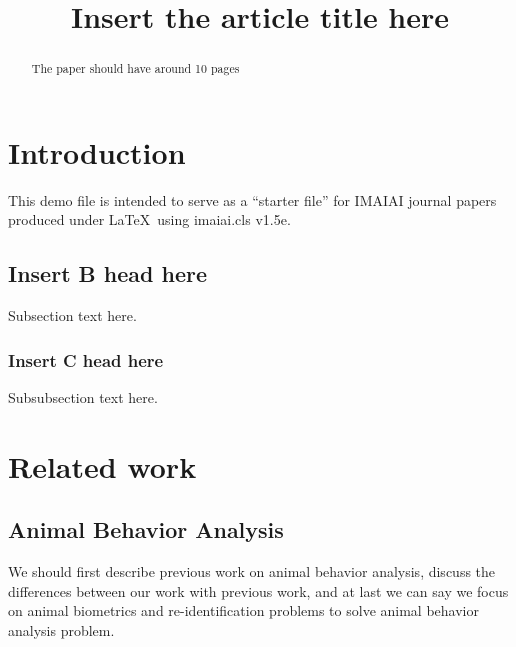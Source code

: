 \documentclass{cta-author}%
\begin{document}
\title{Insert the article title here}

\author{%
}

\address{%
}

\begin{abstract}
The paper should have around 10 pages
\end{abstract}

\maketitle

\section{Introduction}
\cite{morel2009asift}
This demo file is intended to serve as a ``starter file''
for IMAIAI journal papers produced under \LaTeX\ using
imaiai.cls v1.5e.

\subsection{Insert B head here}
Subsection text here.


\subsubsection{Insert C head here}
Subsubsection text here.


\section{Related work}

\subsection{Animal Behavior Analysis}
We should first describe previous work on animal behavior analysis, discuss the differences between our work with previous work, and at last we can say we focus on animal biometrics and re-identification problems to solve animal behavior analysis problem.
\end{document}
